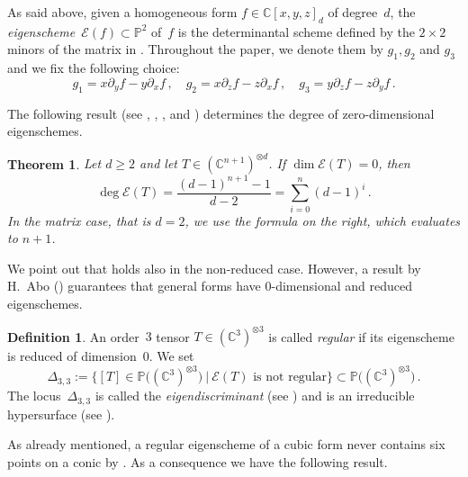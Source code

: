 \documentclass[a4paper, 11pt, reqno]{amsart}
\theoremstyle{plain}
\newtheorem{theorem}[lemma]{Theorem}
\theoremstyle{definition}
\newtheorem{definition}[lemma]{Definition}
\newcommand{\C}{\mathbb{C}}
\newcommand{\p}{\mathbb{P}}
\newcommand{\Eig}[1]{\mathcal{E}\!\left( {#1} \right)}
\begin{document}
As said above, given a homogeneous form $f \in \C[x,y,z]_d$ of degree~$d$, the \emph{eigenscheme}~$\Eig{f} \subset \p^2$ of~$f$ is the determinantal scheme defined by the $2 \times 2$ minors of the matrix in .
Throughout the paper, we denote them by $g_1, g_2$ and $g_3$ and we fix the following choice:
%
\begin{equation}
\label{eq:def_minors}
 g_1 = x \partial_y f - y \partial_x f \,, \quad
 g_2 = x \partial_z f - z \partial_x f \,, \quad
 g_3 = y \partial_z f - z \partial_y f \,.
\end{equation}
%


The following result (see \cite[Theorem 2.1]{CartSturm}, \cite{ASS}, \cite{OO}, and \cite[Equation~5.2]{Abo}) determines the degree of zero-dimensional eigenschemes.

\begin{theorem}
\label{theorem:nonempty}
Let $d \ge 2$ and let $T \in (\C^{n+1})^{\otimes d}$.
If $\dim \Eig{T}=0$, then 
%
\[
  \deg \Eig{T} =
  \frac{(d-1)^{n+1}-1}{d-2} =
  \sum_{i=0}^{n} (d-1)^i \,.
\]
%
In the matrix case, that is $d = 2$, we use the formula on the right, which evaluates to $n+1$.
\end{theorem}

We point out that  holds also in the non-reduced case. However, a result by H.\ Abo (\cite[Corollary 5.8]{Abo}) guarantees that general forms have $0$-dimensional and reduced eigenschemes.

\begin{definition}
\label{definition:eigendiscriminant}
An order~$3$ tensor $T \in (\C^3)^{\otimes 3}$ is called \emph{regular} if its eigenscheme is reduced of dimension~$0$.
We set
%
\[
 \Delta_{3,3} := \{[T]\in \p \bigl( (\C^3)^{\otimes 3} \bigr) \ | \ \Eig{T} \textrm{\ is \ not \ regular} \} \subset \p \bigl( (\C^3)^{\otimes 3} \bigr) \,.
\]
%
The locus~$\Delta_{3,3}$ is called the \emph{eigendiscriminant} (see \cite[Definition 5.5]{Abo}) and is an irreducible hypersurface (see \cite[Corollary 5.8]{Abo}).
\end{definition}

As already mentioned, a regular eigenscheme of a cubic form never contains six points on a conic by \cite[Theorem 5.1]{ASS}. As a consequence we have the following result.
\end{document}
